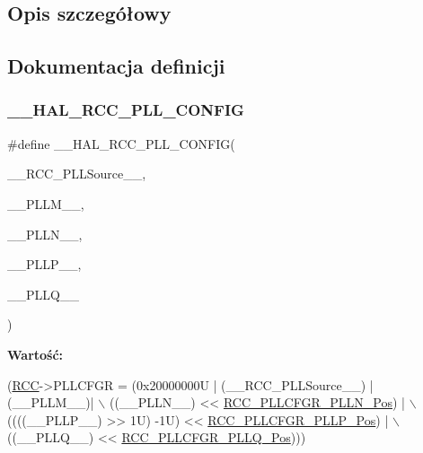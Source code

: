 \subsection{Opis szczegółowy}


\subsection{Dokumentacja definicji}
\mbox{\label{group___r_c_c_ex___exported___macros_ga56d9ad48b28e7aa4ad3aadca5b4fd431}} 
\subsubsection{\texorpdfstring{\+\_\+\+\_\+\+H\+A\+L\+\_\+\+R\+C\+C\+\_\+\+P\+L\+L\+\_\+\+C\+O\+N\+F\+IG}{\_\_HAL\_RCC\_PLL\_CONFIG}}
{\footnotesize\ttfamily \#define \+\_\+\+\_\+\+H\+A\+L\+\_\+\+R\+C\+C\+\_\+\+P\+L\+L\+\_\+\+C\+O\+N\+F\+IG(\begin{DoxyParamCaption}\item[{}]{\+\_\+\+\_\+\+R\+C\+C\+\_\+\+P\+L\+L\+Source\+\_\+\+\_\+,  }\item[{}]{\+\_\+\+\_\+\+P\+L\+L\+M\+\_\+\+\_\+,  }\item[{}]{\+\_\+\+\_\+\+P\+L\+L\+N\+\_\+\+\_\+,  }\item[{}]{\+\_\+\+\_\+\+P\+L\+L\+P\+\_\+\+\_\+,  }\item[{}]{\+\_\+\+\_\+\+P\+L\+L\+Q\+\_\+\+\_\+ }\end{DoxyParamCaption})}

{\bfseries Wartość\+:}
\begin{DoxyCode}
(\hyperlink{group___peripheral__declaration_ga74944438a086975793d26ae48d5882d4}{RCC}->PLLCFGR = (0x20000000U | (\_\_RCC\_PLLSource\_\_) | (\_\_PLLM\_\_)| \(\backslash\)
                            ((\_\_PLLN\_\_) << \hyperlink{group___peripheral___registers___bits___definition_ga78a5913e3fc53a740fe874ece04b2d84}{RCC\_PLLCFGR\_PLLN\_Pos})                | \(\backslash\)
                            ((((\_\_PLLP\_\_) >> 1U) -1U) << \hyperlink{group___peripheral___registers___bits___definition_gaa67d9c488f8ce7cc078b2c7ca607d742}{RCC\_PLLCFGR\_PLLP\_Pos})    | \(\backslash\)
                            ((\_\_PLLQ\_\_) << \hyperlink{group___peripheral___registers___bits___definition_gac574324eee39c3dcee75b37d7728c9ae}{RCC\_PLLCFGR\_PLLQ\_Pos})))
\end{DoxyCode}



